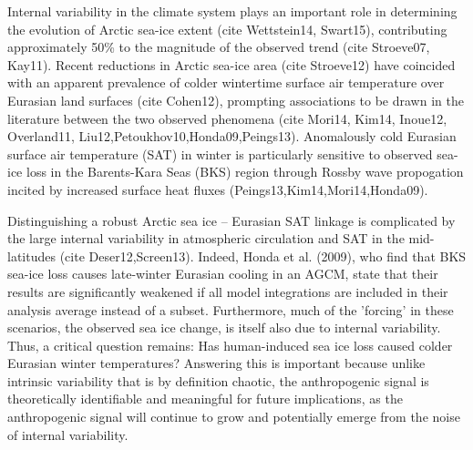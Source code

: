 \documentclass[grl]{AGUTeX}  %
\begin{document}
\begin{article}

%
%



Internal variability in the climate system plays an important role in determining the evolution of Arctic sea-ice extent (cite Wettstein14, Swart15), contributing approximately 50\% to the magnitude of the observed trend (cite Stroeve07, Kay11). Recent reductions in Arctic sea-ice area (cite Stroeve12) have coincided with an apparent prevalence of colder wintertime surface air temperature over Eurasian land surfaces (cite Cohen12), prompting associations to be drawn in the literature between the two observed phenomena (cite Mori14, Kim14, Inoue12, Overland11, Liu12,Petoukhov10,Honda09,Peings13). Anomalously cold Eurasian surface air temperature (SAT) in winter is particularly sensitive to observed sea-ice loss in the Barents-Kara Seas (BKS) region through Rossby wave propogation incited by increased surface heat fluxes (Peings13,Kim14,Mori14,Honda09). 

Distinguishing a robust Arctic sea ice -- Eurasian SAT linkage is complicated by the large internal variability in atmospheric circulation and SAT in the mid-latitudes (cite Deser12,Screen13). Indeed, Honda et al. (2009), who find that BKS sea-ice loss causes late-winter Eurasian cooling in an AGCM, state that their results are significantly weakened if all model integrations are included in their analysis average instead of a subset. Furthermore, much of the 'forcing' in these scenarios, the observed sea ice change, is itself also due to internal variability. Thus, a critical question remains: Has human-induced sea ice loss caused colder Eurasian winter temperatures? Answering this is important because unlike intrinsic variability that is by definition chaotic, the anthropogenic signal is theoretically identifiable and meaningful for future implications, as the anthropogenic signal will continue to grow and potentially emerge from the noise of internal variability.


\end{article}
\end{document}
